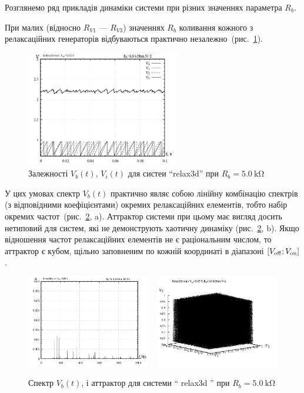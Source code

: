 Розглянемо ряд прикладів динаміки системи при різних значеннях
параметра $R_b$.

При малих (відносно $ R_{V1} $ --- $ R_{V3} $) значеннях
$ R_b $ коливання кожного з релаксаційних генераторів відбуваються
практично незалежно~(рис.~\ref{atu:f:relax3d_t_02}).

\begin{figure}[htb!]
  \centerline{\includegraphics[width=0.6\textwidth]{p/relax3d_t_02.png} }
  \caption{Залежності $V_b(t)$, $V_i(t)$ для систеи ``relax3d'' при $R_b=\SI{5.0}{\kilo\ohm}$ }
  \label{atu:f:relax3d_t_02}
\end{figure}


У цих умовах спектр
$ V_b (t) $ практично являє собою лінійну комбінацію спектрів (з
відповідними коефіцієнтами) окремих релаксаційних елементів,
тобто набір окремих частот~(рис.~\ref{atu:f:relax3d_f_02}, a). Аттрактор
системи при цьому має вигляд досить нетиповий для систем, які
не демонструють хаотичну динаміку (рис.~\ref{atu:f:relax3d_f_02}, b). Якщо
відношення частот релаксаційних елементів не є раціональним
числом, то аттрактор є кубом, щільно заповненим по кожній
координаті в діапазоні
$ [V _\mathrm{off}; V _\mathrm{on}] $.


\begin{figure}[htb!]
  \centerline{
    \includegraphics[width=0.48\textwidth]{p/relax3d_f_02.png}
    ~
    \includegraphics[width=0.48\textwidth]{p/relax3d_v1v2v3_02.png}
  }
\caption{Спектр $ V_b (t) $, і аттрактор для системи `` relax3d '' при $ R_b = \SI{5.0}{\kilo \ohm} $}
\label{atu:f:relax3d_f_02}
\end{figure}


